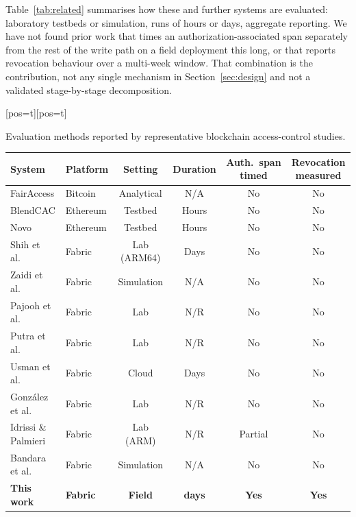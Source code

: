\documentclass[a4paper,fleqn]{cas-sc}
\makeatletter
\newenvironment{widetab}[1][pos=t]
  {\ifdoublecol \@nameuse{table*}[#1]\else \@nameuse{table}[#1]\fi}
  {\ifdoublecol \@nameuse{endtable*}\else \@nameuse{endtable}\fi}
\makeatother
\begin{document}
Table~\ref{tab:related} summarises how these and further systems
\cite{zaidi2023fabrication,bandara2021modeling} are evaluated: laboratory
testbeds or simulation, runs of hours or days, aggregate reporting. We have
not found prior work that times an authorization-associated span separately
from the rest of the write path on a field deployment this long, or that
reports revocation behaviour over a multi-week window. That combination is
the contribution, not any single mechanism in Section~\ref{sec:design} and
not a validated stage-by-stage decomposition.

\begin{widetab}
\caption{Evaluation methods reported by representative blockchain access-control studies.}
\label{tab:related}
\small
\begin{tabularx}{\linewidth}{@{}l l c c c C@{}}
\toprule
System & Platform & Setting & Duration & Auth.\ span timed & Revocation measured \\
\midrule
FairAccess \cite{ouaddah2016fairaccess}   & Bitcoin  & Analytical & N/A   & No & No \\
BlendCAC \cite{xu2018blendcac}            & Ethereum & Testbed    & Hours & No & No \\
Novo \cite{novo2018blockchain}            & Ethereum & Testbed    & Hours & No & No \\
Shih et al.\ \cite{shih2022iiot}          & Fabric   & Lab (ARM64)& Days  & No & No \\
Zaidi et al.\ \cite{zaidi2023fabrication} & Fabric   & Simulation & N/A   & No & No \\
Pajooh et al.\ \cite{pajooh2022fabric_iot}& Fabric   & Lab        & N/R   & No & No \\
Putra et al.\ \cite{putra2021trust}       & Fabric   & Lab        & N/R   & No & No \\
Usman et al.\ \cite{usman2024blockchain}  & Fabric   & Cloud      & Days  & No & No \\
Gonz\'{a}lez et al.\ \cite{gonzalez2023marketplace} & Fabric & Lab & N/R & No & No \\
Idrissi \& Palmieri \cite{idrissi2024blockchain_jsupercomput}
                                          & Fabric   & Lab (ARM)  & N/R   & Partial & No \\
Bandara et al.\ \cite{bandara2021modeling}& Fabric   & Simulation & N/A   & No & No \\
\textbf{This work}                        & \textbf{Fabric} &
  \textbf{Field} & \textbf{\DeployDays{} days} & \textbf{Yes} & \textbf{Yes} \\
\bottomrule
\end{tabularx}
\end{widetab}
\end{document}

